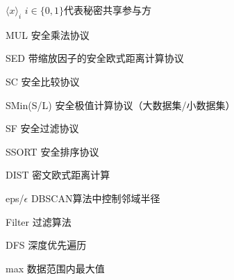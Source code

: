 \begin{denotation}
\item[$ \langle x \rangle_i $] $ i\in\{0,1\} $代表秘密共享参与方
\item[MUL] 安全乘法协议
\item[SED] 带缩放因子的安全欧式距离计算协议
\item[SC] 安全比较协议
\item[SMin(S/L)] 安全极值计算协议（大数据集/小数据集）
\item[SF] 安全过滤协议
\item[SSORT] 安全排序协议
\item[DIST] 密文欧式距离计算
\item[eps/$ \epsilon $] DBSCAN算法中控制邻域半径
\item[Filter] 过滤算法
\item[DFS] 深度优先遍历
\item[max] 数据范围内最大值

%	

\end{denotation}
